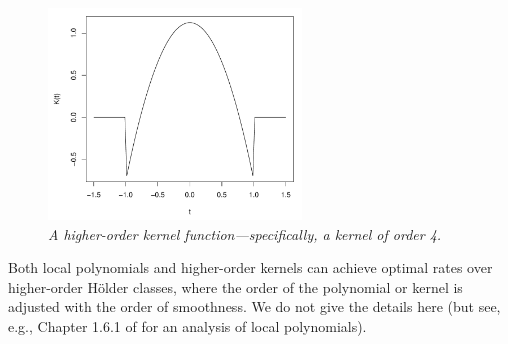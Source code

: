 \documentclass{article}
\begin{document}
\begin{figure}[tb]
\centering
\includegraphics[width=0.6\textwidth]{order4.pdf}
\caption{\it A higher-order kernel function---specifically, a kernel of  order 
  4.}   
\label{fig:order4}
\end{figure}

Both local polynomials and higher-order kernels can achieve optimal rates over
higher-order H{\"older} classes, where the order of the polynomial or kernel is
adjusted with the order of smoothness. We do not give the details here (but see, 
e.g., Chapter 1.6.1 of \citet{tsybakov2009introduction} for an analysis of local 
polynomials). 



\end{document}
